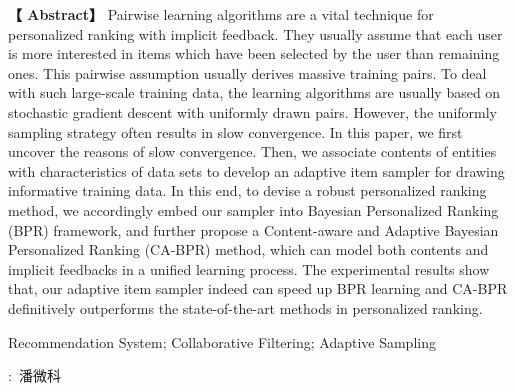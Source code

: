 \newpage

\centerline{\fangsong\bf{}}


\vskip 20bp

\hspace{4bp} {\textbf{【 Abstract】}} 
Pairwise learning algorithms are a vital technique
for personalized ranking with implicit feedback. They usually
assume that each user is more interested in items which have
been selected by the user than remaining ones. This pairwise
assumption usually derives massive training pairs. To deal with
such large-scale training data, the learning algorithms are usually
based on stochastic gradient descent with uniformly drawn pairs.
However, the uniformly sampling strategy often results in slow
convergence. In this paper, we first uncover the reasons of
slow convergence. Then, we associate contents of entities with
characteristics of data sets to develop an adaptive item sampler
for drawing informative training data. In this end, to devise a
robust personalized ranking method, we accordingly embed our
sampler into Bayesian Personalized Ranking (BPR) framework,
and further propose a Content-aware and Adaptive Bayesian
Personalized Ranking (CA-BPR) method, which can model both
contents and implicit feedbacks in a unified learning process. The
experimental results show that, our adaptive item sampler indeed
can speed up BPR learning and CA-BPR definitively outperforms
the state-of-the-art methods in personalized ranking.

\vskip 10bp

Recommendation System; Collaborative Filtering; Adaptive Sampling


\vskip 20bp

\begin{flushright}
	:\ 潘微科 \hspace{3cm}{ }
\end{flushright}